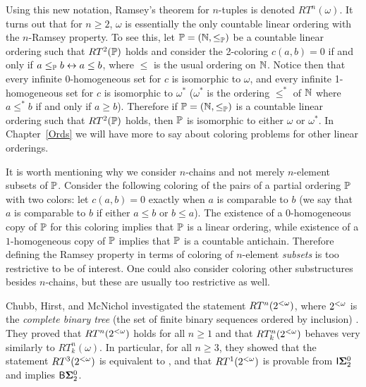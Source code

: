 Using this new notation, Ramsey's theorem for $n$-tuples
is denoted $RT^n(\omega)$.
It turns out that for $n\geq 2$, $\omega$ is essentially
the only countable linear ordering with the $n$-Ramsey property.
To see this, let $\mathbb{P}=(\mathbb{N},\leq_{\mathbb{P}})$ be a countable linear
ordering such that $RT^2(\mathbb{P})$ holds and consider the 2-coloring
$c(a,b)=0$ if and only if $a\leq_{\mathbb{P}} b\leftrightarrow a\leq b$,
where $\leq$ is the usual ordering on $\mathbb{N}$.
Notice then that every infinite 0-homogeneous set for $c$
is isomorphic to $\omega$, and every infinite 1-homogeneous set for $c$
is isomorphic to $\omega^*$
($\omega^*$ is the ordering $\leq^*$ of $\mathbb{N}$
where $a\leq^*b$ if and only if $a\geq b$).
Therefore if $\mathbb{P}=(\mathbb{N},\leq_{\mathbb{P}})$ is a countable linear ordering such that
$RT^2(\mathbb{P})$ holds, then $\mathbb{P}$ is isomorphic to either $\omega$ or $\omega^*$.
In Chapter~\ref{Ords} we will have more to say about
coloring problems for other linear orderings.

It is worth mentioning why we consider $n$-chains and not merely
$n$-element subsets of $\mathbb{P}$.
Consider the following coloring of the pairs of a partial ordering $\mathbb{P}$ with two
colors: let $c(a,b)=0$ exactly when $a$ is comparable to $b$
(we say that $a$ is comparable to $b$ if either $a\leq b$ or $b\leq a$).
The existence of a $0$-homogeneous copy of $\mathbb{P}$ for this coloring
implies that $\mathbb{P}$ is a linear ordering, while
existence of a $1$-homogeneous copy of $\mathbb{P}$ implies that $\mathbb{P}$ is a
countable antichain.
Therefore defining the Ramsey property in terms of coloring
of $n$-element \textit{subsets} is too restrictive to be of interest.
One could also consider coloring other substructures besides $n$-chains,
but these are usually too restrictive as well.

Chubb, Hirst, and McNichol investigated the statement
$RT^n(2^{<\omega})$, where $2^{<\omega}$ is the \textit{complete binary tree}
(the set of finite binary sequences ordered by inclusion) \cite{CHM}.
They proved that $RT^n(2^{<\omega})$ holds for all $n\geq 1$
and that $RT^n_k(2^{<\omega})$ behaves very similarly to
$RT^n_k(\omega)$.
In particular, for all $n\geq 3$, they showed that the
statement $RT^3(2^{<\omega})$ is equivalent to \ACAo,
and that $RT^1(2^{<\omega})$ is provable from
$\mathsf{I}{\mathbf{\Sigma}^0_2}$ and implies $\mathsf{B}{\mathbf{\Sigma}^0_2}$.


